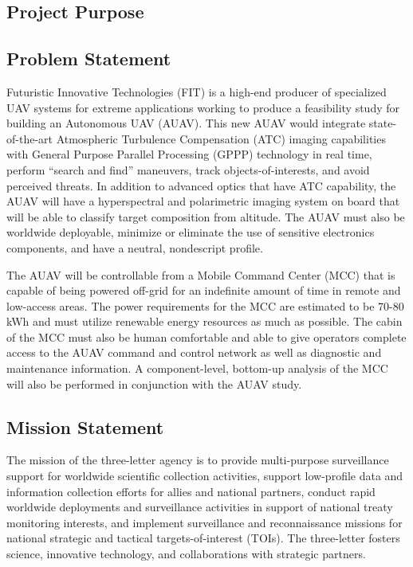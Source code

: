 \begin{fullwidth}
\section{Project Purpose}

\subsection{Problem Statement}
    Futuristic Innovative Technologies (FIT) is a high-end producer of specialized UAV systems for extreme applications working to produce a feasibility study for building an Autonomous UAV (AUAV). This new AUAV would integrate state-of-the-art Atmospheric Turbulence Compensation (ATC) imaging capabilities with General Purpose Parallel Processing (GPPP) technology in real time, perform “search and find” maneuvers, track objects-of-interests, and avoid perceived threats. In addition to advanced optics that have ATC capability, the AUAV will have a hyperspectral and polarimetric imaging system on board that will be able to classify target composition from altitude. The AUAV must also be worldwide deployable, minimize or eliminate the use of sensitive electronics components, and have a neutral, nondescript profile.
    
    The AUAV will be controllable from a Mobile Command Center (MCC) that is capable of being powered off-grid for an indefinite amount of time in remote and low-access areas. The power requirements for the MCC are estimated to be 70-80 kWh and must utilize renewable energy resources as much as possible. The cabin of the MCC must also be human comfortable and able to give operators complete access to the AUAV command and control network as well as diagnostic and maintenance information. A component-level, bottom-up analysis of the MCC will also be performed in conjunction with the AUAV study.

\subsection{Mission Statement}
    The mission of the three-letter agency is to provide multi-purpose surveillance support for worldwide scientific collection activities, support low-profile data and information collection efforts for allies and national partners, conduct rapid worldwide deployments and surveillance activities in support of national treaty monitoring interests, and implement surveillance and reconnaissance missions for national strategic and tactical targets-of-interest (TOIs). The three-letter fosters science, innovative technology, and collaborations with strategic partners. 
    
\end{fullwidth}